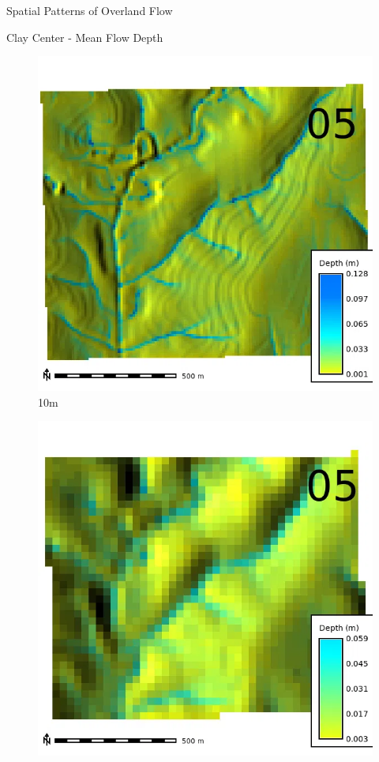 \documentclass[
  ignorenonframetext,
]{beamer}
\begin{document}
\begin{frame}{Spatial Patterns of Overland Flow}
\begin{block}{Clay Center - Mean Flow Depth}
\begin{figure}[H]
{\centering \includegraphics{../output/clay-center/sensitivity_1/clay-center_depth_10_1_s_average.webp}

}

\caption{10m}

\end{figure}%

\begin{figure}[H]

{\centering \includegraphics{../output/clay-center/sensitivity_1/clay-center_depth_30_1_s_average.webp}

}
\end{figure}
\end{block}
\end{frame}
\end{document}
